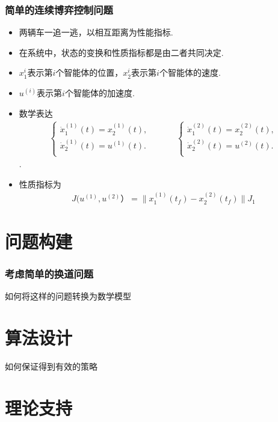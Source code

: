 \documentclass[UTF8, aspectratio=169, 9pt]{ctexbeamer}
\begin{document}
\begin{frame}
  \frametitle{简单的连续博弈控制问题}
  \begin{itemize}
  \item 两辆车一追一逃，以相互距离为性能指标.
  \item 在系统中，状态的变换和性质指标都是由二者共同决定.
  \item $x_1^i$表示第$i$个智能体的位置，$x_2^i$表示第$i$个智能体的速度.
  \item $u^{(i)}$表示第$i$个智能体的加速度.
  \item 数学表达
    \begin{align}
      \left\{\begin{matrix}
          \dot{x}_1^{(1)} (t) = x_2^{(1)} (t), \\
          \dot{x}_2^{(1)} (t) = u^{(1)} (t). \\
        \end{matrix}\right.
      \quad \quad \quad
      \left\{\begin{matrix}
          \dot{x}_1^{(2)} (t) = x_2^{(2)} (t), \\
          \dot{x}_2^{(2)} (t) = u^{(2)} (t). \\
        \end{matrix}\right.
    \end{align}.
  \item 性质指标为
    \begin{align}
      J(u^{(1)}, u^{(2)}） = \| x_1^{(1)} (t_f) - x_2^{(2)} (t_f) \|
      J_1
    \end{align}
  \end{itemize}
\end{frame}

\section{问题构建}
\begin{frame}
\frametitle{考虑简单的换道问题}
  如何将这样的问题转换为数学模型
\end{frame}

\section{算法设计}
\begin{frame}

  如何保证得到有效的策略
\end{frame}




\section{理论支持}
\begin{frame}

\end{frame}
\end{document}
